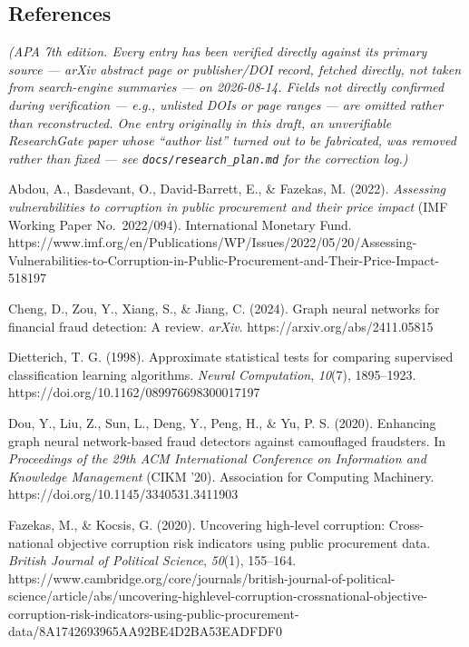\documentclass[11pt,]{article}
\begin{document}
\hypertarget{references}{%
\subsection{References}\label{references}}

\emph{(APA 7th edition. Every entry has been verified directly against
its primary source --- arXiv abstract page or publisher/DOI record,
fetched directly, not taken from search-engine summaries --- on
2026-08-14. Fields not directly confirmed during verification --- e.g.,
unlisted DOIs or page ranges --- are omitted rather than reconstructed.
One entry originally in this draft, an unverifiable ResearchGate paper
whose ``author list'' turned out to be fabricated, was removed rather
than fixed --- see \texttt{docs/research\_plan.md} for the correction
log.)}

Abdou, A., Basdevant, O., David-Barrett, E., \& Fazekas, M. (2022).
\emph{Assessing vulnerabilities to corruption in public procurement and
their price impact} (IMF Working Paper No.~2022/094). International
Monetary Fund.
https://www.imf.org/en/Publications/WP/Issues/2022/05/20/Assessing-Vulnerabilities-to-Corruption-in-Public-Procurement-and-Their-Price-Impact-518197

Cheng, D., Zou, Y., Xiang, S., \& Jiang, C. (2024). Graph neural
networks for financial fraud detection: A review. \emph{arXiv}.
https://arxiv.org/abs/2411.05815

Dietterich, T. G. (1998). Approximate statistical tests for comparing
supervised classification learning algorithms. \emph{Neural
Computation}, \emph{10}(7), 1895--1923.
https://doi.org/10.1162/089976698300017197

Dou, Y., Liu, Z., Sun, L., Deng, Y., Peng, H., \& Yu, P. S. (2020).
Enhancing graph neural network-based fraud detectors against camouflaged
fraudsters. In \emph{Proceedings of the 29th ACM International
Conference on Information and Knowledge Management} (CIKM '20).
Association for Computing Machinery.
https://doi.org/10.1145/3340531.3411903

Fazekas, M., \& Kocsis, G. (2020). Uncovering high-level corruption:
Cross-national objective corruption risk indicators using public
procurement data. \emph{British Journal of Political Science},
\emph{50}(1), 155--164.
https://www.cambridge.org/core/journals/british-journal-of-political-science/article/abs/uncovering-highlevel-corruption-crossnational-objective-corruption-risk-indicators-using-public-procurement-data/8A1742693965AA92BE4D2BA53EADFDF0
\end{document}
